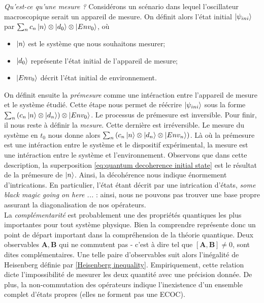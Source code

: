 \documentclass[11pt,oneside,a4paper]{article}
\begin{document}
\emph{Qu'est-ce qu'une mesure ?} Considérons un scénario dans lequel l'oscillateur macroscopique serait un appareil de mesure. On définit alors l'état initial $\ket{\psi_{ini}}$ par $\sum_n c_n\ket{n}\otimes\ket{d_0}\otimes\ket{Env_0}$, où 
\begin{itemize}
  \item[\ding{108}] $\ket{n}$ est le système que nous souhaitons mesurer;
  \item[\ding{108}] $\ket{d_0}$ représente l'état initial de l'appareil de mesure;
  \item[\ding{108}] $\ket{Env_0}$ décrit l'état initial de environnement.
\end{itemize}
On définit ensuite la \emph{prémesure} comme une intéraction entre l'appareil de mesure et le système étudié. Cette étape nous permet de réécrire $\ket{\psi_{ini}}$ sous la forme $\sum_n  \left(c_n\ket{n}\otimes\ket{d_n}\right)\otimes\ket{Env_0}$. Le processus de prémesure est inversible. Pour finir, il nous reste à définir la \emph{mesure}. Cette dernière est irréversible. Le mesure du système en $t_0$ nous donne alors $\sum_n \left(c_n\ket{n}\otimes\ket{d_n}\otimes\ket{Env_n}\right)$. Là où la prémesure est une intéraction entre le système et le dispositif expérimental, la mesure est une intéraction entre le système et l'environnement. Observons que dans cette description, la superposition \eqref{eq:quantum decoherence initial state} est le résultat de la prémesure de $\ket{n}$. Ainsi, la décohérence nous indique énormement d'intrications. En particulier, l'état étant décrit par une intrication d'états, \emph{some black magic going on here ...} : ainsi, nous ne pouvons pas trouver une base propre assurant la diagonalisation de nos opérateurs.\\

La \emph{complémentarité} est probablement une des propriétés quantiques les plus importantes pour tout système physique. Bien la comprendre représente donc un point de départ important dans la compréhension de la théorie quantique. Deux observables $\bm{A},\bm{B}$ qui ne commutent pas - c'est à dire tel que $\left[\bm{A},\bm{B}\right]\neq 0$, sont dites complémentaires. Une telle paire d'observables suit alors l'inégalité de Heisenberg définie par \eqref{Heisenberg inequality}. Empiriquement, cette relation dicte l'impossibilité de mesurer les deux quantité avec une précision donnée. De plus, la non-commutation des opérateurs indique l'inexistence d'un ensemble complet d'états propres (elles ne forment pas une ECOC).\\
\end{document}
